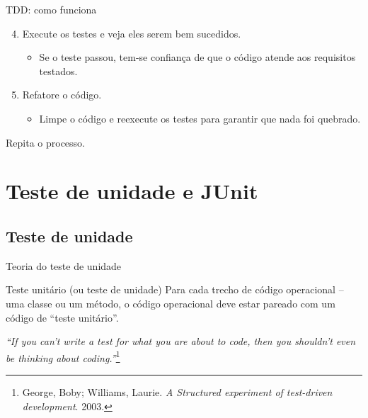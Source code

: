 \documentclass[handout]{beamer}
\begin{document}
\begin{frame}{TDD: como funciona}

\begin{enumerate}
\setcounter{enumi}{3}
\item Execute os testes e veja eles serem bem sucedidos.
\begin{itemize}
\item Se o teste passou, tem-se confiança de que o código atende aos requisitos testados. 
\end{itemize}
\item Refatore o código.
\begin{itemize}
\item Limpe o código e reexecute os testes para garantir que nada foi quebrado.
\end{itemize}
\end{enumerate}

Repita o processo.

\end{frame}


\section{Teste de unidade e JUnit}

\subsection{Teste de unidade}

\begin{frame}{Teoria do teste de unidade}

\begin{block}{Teste unitário (ou teste de unidade)}
Para cada trecho de código operacional -- uma classe ou um método, o código operacional deve estar pareado com um código de ``teste unitário''.
\end{block} 

\vspace{5mm}

\textit{``If you can't write a test for what you are about to code, then you shouldn't even be thinking about coding.''}\footnote{George, Boby; Williams, Laurie. \textit{A Structured experiment of test-driven development}. 2003.}
\end{frame}
\end{document}
